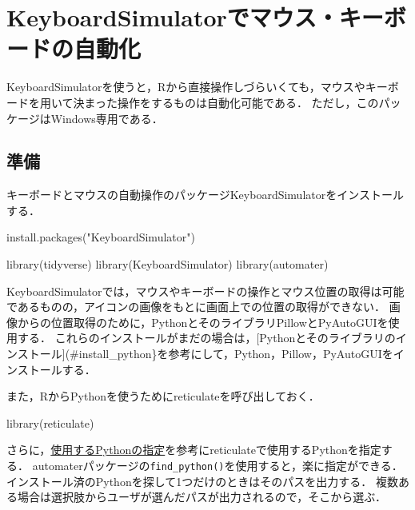 \documentclass[
]{article}
\newenvironment{Shaded}{\begin{snugshade}}{\end{snugshade}}
\newcommand{\FunctionTok}[1]{\textcolor[rgb]{0.00,0.00,0.00}{#1}}
\newcommand{\NormalTok}[1]{#1}
\newcommand{\StringTok}[1]{\textcolor[rgb]{0.31,0.60,0.02}{#1}}
\begin{document}
\hypertarget{keyboardsimulator}{%
\section{KeyboardSimulatorでマウス・キーボードの自動化}\label{keyboardsimulator}}

KeyboardSimulatorを使うと，Rから直接操作しづらいくても，マウスやキーボードを用いて決まった操作をするものは自動化可能である．
ただし，このパッケージはWindows専用である．

\hypertarget{ux6e96ux5099-7}{%
\subsection{準備}\label{ux6e96ux5099-7}}

キーボードとマウスの自動操作のパッケージKeyboardSimulatorをインストールする．

\begin{Shaded}
\begin{Highlighting}[]
\FunctionTok{install.packages}\NormalTok{(}\StringTok{"KeyboardSimulator"}\NormalTok{)}
\end{Highlighting}
\end{Shaded}

\begin{Shaded}
\begin{Highlighting}[]
\FunctionTok{library}\NormalTok{(tidyverse)}
\FunctionTok{library}\NormalTok{(KeyboardSimulator)}
\FunctionTok{library}\NormalTok{(automater)}
\end{Highlighting}
\end{Shaded}

KeyboardSimulatorでは，マウスやキーボードの操作とマウス位置の取得は可能であるものの，アイコンの画像をもとに画面上での位置の取得ができない．
画像からの位置取得のために，PythonとそのライブラリPillowとPyAutoGUIを使用する．
これらのインストールがまだの場合は，{[}Pythonとそのライブラリのインストール{]}(\#install\_python\}を参考にして，Python，Pillow，PyAutoGUIをインストールする．

また，RからPythonを使うためにreticulateを呼び出しておく．

\begin{Shaded}
\begin{Highlighting}[]
\FunctionTok{library}\NormalTok{(reticulate)}
\end{Highlighting}
\end{Shaded}

さらに，\protect\hyperlink{identify_python}{使用するPythonの指定}を参考にreticulateで使用するPythonを指定する．
automaterパッケージの\texttt{find\_python()}を使用すると，楽に指定ができる．
インストール済のPythonを探して1つだけのときはそのパスを出力する．
複数ある場合は選択肢からユーザが選んだパスが出力されるので，そこから選ぶ．
\end{document}
